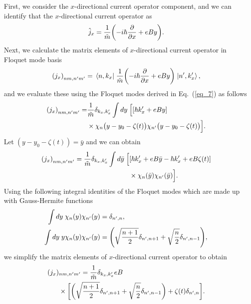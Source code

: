 First, we consider the $x$-directional current operator component, and we can identify that the $x$-directional current operator as
\begin{equation} \label{eq_d4}
  \hat{j}_x = \frac{1}{\tilde{m}} \qty(-i\hbar\pdv{x} + eBy).
\end{equation}
Next, we calculate the matrix elements of $x$-directional current operator in Floquet mode basis
\begin{equation} \label{eq_d5}
  \qty({j}_x)_{nm,n'm'} =
  \mel{n,k_x}{\;\frac{1}{\tilde{m}} \qty(-i\hbar\pdv{x} + eBy)\;}{n',k'_x},
\end{equation}
and we evaluate these using the Floquet modes derived in Eq.~(\ref{eq_7}) as follows
\begin{equation} \label{eq_d6}
  \begin{aligned}
    \qty({j}_x)_{nm,n'm'} = &
    \frac{1}{{\tilde{m}}}
    \delta_{k_x,k'_x}
    \int dy \;
    \Big[
    \qty[\hbar k'_x + eBy] \\
    & \times
     \chi_{n}\big(y - y_0 - \zeta(t)\big)
    \chi_{n'}\big(y - y_0 - \zeta(t)\big)
    \Big].
  \end{aligned}
\end{equation}
Let $(y - y_0 - \zeta(t)) = \bar{y}$ and we can obtain
\begin{equation} \label{eq_d7}
  \begin{aligned}
    \qty({j}_x)_{nm,n'm'} =
    \frac{1}{{\tilde{m}}}
    \delta_{k_x,k'_x}
    \int d\bar{y} \;
    \Big[ &
    \qty[\hbar k'_x + eB\bar{y} -\hbar k'_x + eB\zeta(t)] \\
    & \times
    \chi_{n}(\bar{y})
    \chi_{n'}(\bar{y})
    \Big].
  \end{aligned}
\end{equation}
Using the following integral identities of the Floquet modes which are made up with Gauss-Hermite functions \cite{vedenyapin11,szego59}
\begin{subequations} \label{eq_d8}
  \begin{align}
    \int d{y} \;
    \chi_{n}({y})
    \chi_{n'}({y}) &=
    \delta_{n',n}, \\
    \int dy \;
    y
    \chi_{n}({y})
    \chi_{n'}({y}) &=
    \qty(\sqrt{\frac{n+1}{2}} \delta_{n',n+1} + \sqrt{\frac{n}{2}}
    \delta_{n',n-1}),
  \end{align}
\end{subequations}
we simplify the matrix elements of $x$-directional current operator to obtain
\begin{equation} \label{eq_d9}
  \begin{aligned}
    \qty({j}_x)&_{nm,n'm'} =
    \frac{1}{{\tilde{m}}}
    \delta_{k_x,k'_x}
    eB\\
    & \times
    \bigg[
    \bigg(\sqrt{\frac{n+1}{2}} \delta_{n',n+1} + \sqrt{\frac{n}{2}}
    \delta_{n',n-1}\bigg)
    + \zeta(t) \delta_{n',n}
    \bigg].
  \end{aligned}
\end{equation}
